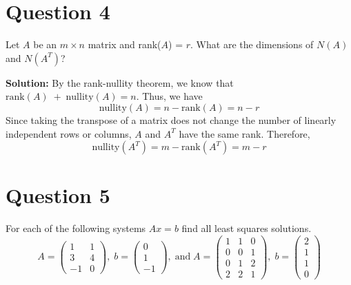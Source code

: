 \documentclass{article}
\begin{document}
\newpage
\section*{Question 4}
Let $A$ be an $m \times n$ matrix and rank($A$) = $r$.
What are the dimensions of $N(A)$ and $N(A^T)$?

\vspace{0.5cm}
\noindent\textbf{Solution:}
By the rank-nullity theorem, we know that $\text{rank}(A) \; + \; \text{nullity}(A) = n$.
Thus, we have
$$ \text{nullity}(A) = n - \text{rank}(A) = n - r $$
Since taking the transpose of a matrix does not change the number of linearly independent rows or columns,
$A$ and $A^T$ have the same rank.
Therefore,
$$ \text{nullity}(A^T) = m - \text{rank}(A^T) = m - r $$

\newpage
\section*{Question 5}
For each of the following systems $Ax = b$ find all least squares solutions.
$$
A = \begin{pmatrix} 1 & 1 \\ 3 & 4 \\ -1 & 0 \end{pmatrix}, \; b = \begin{pmatrix} 0 \\ 1 \\ -1 \end{pmatrix}, \; \text{and} \;
A = \begin{pmatrix} 1 & 1 & 0 \\ 0 & 0 & 1 \\ 0 & 1 & 2 \\ 2 & 2 & 1 \end{pmatrix}, \; b = \begin{pmatrix} 2 \\ 1 \\ 1 \\ 0 \end{pmatrix}
$$
\end{document}
